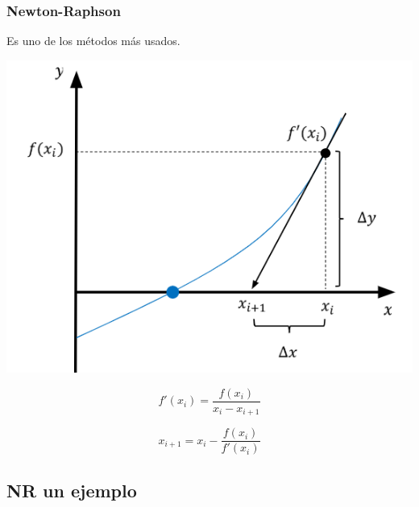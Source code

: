 \documentclass[xcolor=svgnames]{beamer} %
\theoremstyle{plain}
\theoremstyle{definition}
\begin{document}
\begin{frame}
\frametitle{Newton-Raphson}
Es uno de los métodos más usados.

\begin{minipage}{.7\linewidth}
\includegraphics[width=\linewidth]{NewthonRaphson/NR.PNG} 
\end{minipage} \pause \begin{minipage}{.2\linewidth}

$$f'(x_i) = \frac{f(x_i)}{x_{i}-x_{i+1}}  $$

\begin{equation}
\label{eq:nr}
x_{i+1} = x_i - \frac{f(x_i)}{f'(x_i)} 
\end{equation}
\end{minipage}

\end{frame}

\subsection{NR un ejemplo}
\end{document}
